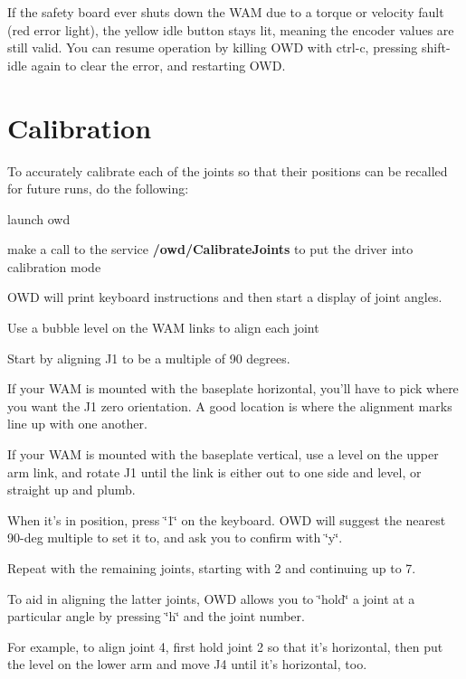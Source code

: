 If the safety board ever shuts down the W\-A\-M due to a torque or velocity fault (red error light), the yellow idle button stays lit, meaning the encoder values are still valid. You can resume operation by killing O\-W\-D with ctrl-\/c, pressing shift-\/idle again to clear the error, and restarting O\-W\-D.\hypertarget{index_calibration}{}\section{Calibration}\label{index_calibration}
To accurately calibrate each of the joints so that their positions can be recalled for future runs, do the following\-:


\begin{DoxyItemize}
\item launch owd
\item make a call to the service {\bfseries /owd/\-Calibrate\-Joints} to put the driver into calibration mode
\item O\-W\-D will print keyboard instructions and then start a display of joint angles.
\item Use a bubble level on the W\-A\-M links to align each joint
\begin{DoxyEnumerate}
\item Start by aligning J1 to be a multiple of 90 degrees.
\begin{DoxyItemize}
\item If your W\-A\-M is mounted with the baseplate horizontal, you'll have to pick where you want the J1 zero orientation. A good location is where the alignment marks line up with one another.
\item If your W\-A\-M is mounted with the baseplate vertical, use a level on the upper arm link, and rotate J1 until the link is either out to one side and level, or straight up and plumb.
\end{DoxyItemize}
\item When it's in position, press \char`\"{}1\char`\"{} on the keyboard. O\-W\-D will suggest the nearest 90-\/deg multiple to set it to, and ask you to confirm with \char`\"{}y\char`\"{}.
\item Repeat with the remaining joints, starting with 2 and continuing up to 7.
\item To aid in aligning the latter joints, O\-W\-D allows you to \char`\"{}hold\char`\"{} a joint at a particular angle by pressing \char`\"{}h\char`\"{} and the joint number.
\begin{DoxyItemize}
\item For example, to align joint 4, first hold joint 2 so that it's horizontal, then put the level on the lower arm and move J4 until it's horizontal, too.

\end{DoxyItemize}
\end{DoxyEnumerate}
\end{DoxyItemize}
